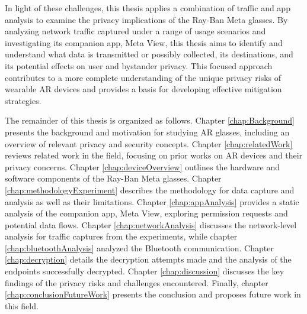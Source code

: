 In light of these challenges, this thesis applies a combination of traffic and app analysis to examine the privacy implications of the Ray-Ban Meta glasses. By analyzing network traffic captured under a range of usage scenarios and investigating its companion app, Meta View, this thesis aims to identify and understand what data is transmitted or possibly collected, its destinations, and its potential effects on user and bystander privacy. This focused approach contributes to a more complete understanding of the unique privacy risks of wearable AR devices and provides a basis for developing effective mitigation strategies.  

The remainder of this thesis is organized as follows. Chapter \ref{chap:Background} presents the background and motivation for studying AR glasses, including an overview of relevant privacy and security concepts. Chapter \ref{chap:relatedWork} reviews related work in the field, focusing on prior works on AR devices and their privacy concerns. Chapter \ref{chap:deviceOverview} outlines the hardware and software components of the Ray-Ban Meta glasses. Chapter \ref{chap:methodologyExperiment} describes the methodology for data capture and analysis as well as their limitations. Chapter \ref{chap:appAnalysis} provides a static analysis of the companion app, Meta View, exploring permission requests and potential data flows. Chapter \ref{chap:networkAnalysis} discusses the network-level analysis for traffic captures from the experiments, while chapter \ref{chap:bluetoothAnalysis} analyzed the Bluetooth communication. Chapter \ref{chap:decryption} details the decryption attempts made and the analysis of the endpoints successfully decrypted. Chapter \ref{chap:discussion} discusses the key findings of the privacy risks and challenges encountered. Finally, chapter \ref{chap:conclusionFutureWork} presents the conclusion and proposes future work in this field.
